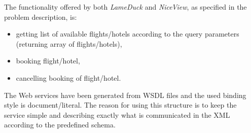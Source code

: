 The functionality offered by both \textit{LameDuck} and \textit{NiceView}, as specified in the problem description, is:
\begin{itemize}
\item getting list of available flights/hotels according to the query parameters (returning array of flights/hotels),
\item booking flight/hotel,
\item cancelling booking of flight/hotel.
\end{itemize}

The Web services have been generated from WSDL files and the used binding style is document/literal. The reason for using this structure is to keep the service simple and describing exactly what is communicated in the XML according to the predefined schema.
